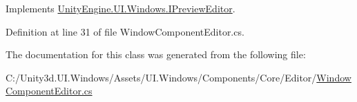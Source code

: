 Implements \hyperlink{interface_unity_engine_1_1_u_i_1_1_windows_1_1_i_preview_editor_a264c28bcd45279a51826e8cba09936ac}{Unity\+Engine.\+U\+I.\+Windows.\+I\+Preview\+Editor}.



Definition at line 31 of file Window\+Component\+Editor.\+cs.



The documentation for this class was generated from the following file\+:\begin{DoxyCompactItemize}
\item 
C\+:/\+Unity3d.\+U\+I.\+Windows/\+Assets/\+U\+I.\+Windows/\+Components/\+Core/\+Editor/\hyperlink{_window_component_editor_8cs}{Window\+Component\+Editor.\+cs}\end{DoxyCompactItemize}
